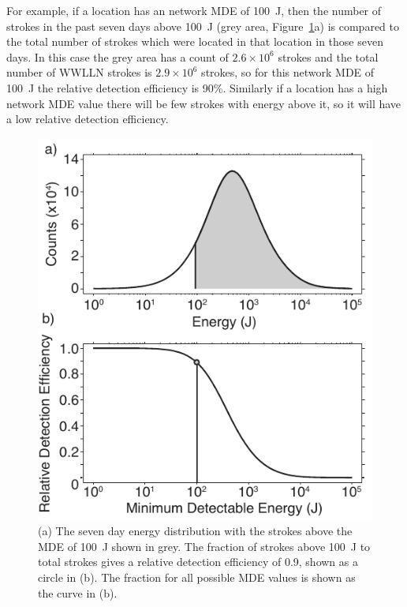 For example, if a location has an network MDE of 100~J, then the number of strokes in the past seven days above 100~J (grey area, Figure~\ref{efficiency:fig:Curve}a) is compared to the total number of strokes which were located in that location in those seven days.
In this case the grey area has a count of $2.6\times10^6$ strokes and the total number of WWLLN strokes is $2.9\times10^6$ strokes, so for this network MDE of 100~J the relative detection efficiency is 90\%.
Similarly if a location has a high network MDE value there will be few strokes with energy above it, so it will have a low relative detection efficiency.

\begin{figure}[ht!]
   \centering
\noindent\includegraphics[scale=1]{efficiency/Figures/2012RS005049-f5.pdf}
   \caption{(a) The seven day energy distribution with the strokes above the MDE of 100~J shown in grey.
The fraction of strokes above 100~J to total strokes gives a relative detection efficiency of 0.9, shown as a circle in (b).
The fraction for all possible MDE values is shown as the curve in (b).}
   \label{efficiency:fig:Curve}
\end{figure}

